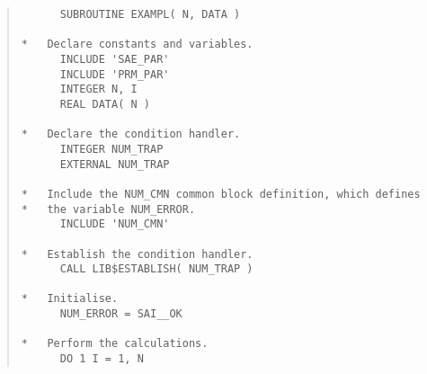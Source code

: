 \begin{quote}
\begin{tabbing} %
\verb#      SUBROUTINE EXAMPL( N, DATA )                #\\
\verb#                                                  #\\
\verb#*   Declare constants and variables.              #\\
\verb#      INCLUDE 'SAE_PAR'                           #\\
\verb#      INCLUDE 'PRM_PAR'                           #\\
\verb#      INTEGER N, I                                #\\
\verb#      REAL DATA( N )                              #\\
\verb#                                                  #\\
\verb#*   Declare the condition handler.                #\\
\verb#      INTEGER NUM_TRAP                            #\\
\verb#      EXTERNAL NUM_TRAP                           #\\
\verb#                                                  #\\
\verb#*   Include the NUM_CMN common block definition, which defines#\\
\verb#*   the variable NUM_ERROR.                       #\\
\verb#      INCLUDE 'NUM_CMN'                           #\\
\verb#                                                  #\\
\verb#*   Establish the condition handler.              #\\
\verb#      CALL LIB$ESTABLISH( NUM_TRAP )              #\\
\verb#                                                  #\\
\verb#*   Initialise.                                   #\\
\verb#      NUM_ERROR = SAI__OK                         #\\
\verb#                                                  #\\
\verb#*   Perform the calculations.                     #\\
\verb#      DO 1 I = 1, N                               #\\

\end{tabbing}
\end{quote}
